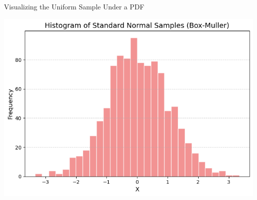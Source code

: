 \documentclass[8pt]{beamer}
\begin{document}
\begin{frame}{Visualizing the Uniform Sample Under a PDF}
\begin{center}
\includegraphics[scale=0.5]{chapter1-part6-plot1.png}
\end{center}
\end{frame}
\end{document}
